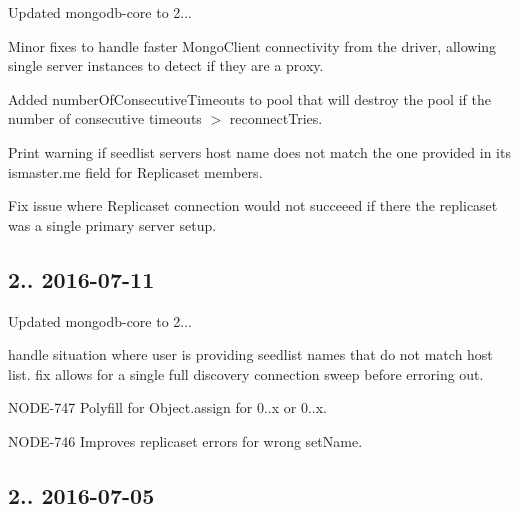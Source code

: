 \begin{DoxyItemize}
\item Updated mongodb-\/core to 2...
\item Minor fixes to handle faster Mongo\+Client connectivity from the driver, allowing single server instances to detect if they are a proxy.
\item Added number\+Of\+Consecutive\+Timeouts to pool that will destroy the pool if the number of consecutive timeouts $>$ reconnect\+Tries.
\item Print warning if seedlist servers host name does not match the one provided in it\textquotesingle{}s ismaster.\+me field for Replicaset members.
\item Fix issue where Replicaset connection would not succeeed if there the replicaset was a single primary server setup.
\end{DoxyItemize}

\subsection*{2.. 2016-\/07-\/11 }


\begin{DoxyItemize}
\item Updated mongodb-\/core to 2...
\item handle situation where user is providing seedlist names that do not match host list. fix allows for a single full discovery connection sweep before erroring out.
\item N\+O\+D\+E-\/747 Polyfill for Object.\+assign for 0..\+x or 0..\+x.
\item N\+O\+D\+E-\/746 Improves replicaset errors for wrong set\+Name.
\end{DoxyItemize}

\subsection*{2.. 2016-\/07-\/05 }


